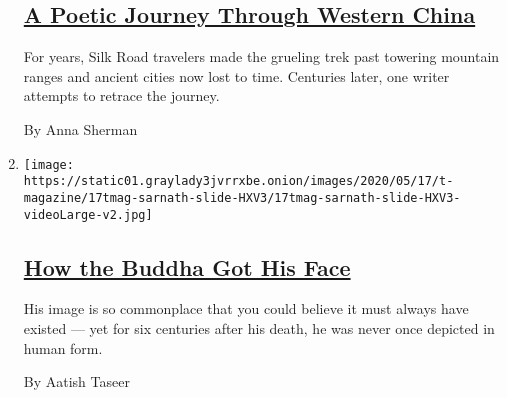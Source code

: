 \begin{enumerate}
  \hypertarget{a-poetic-journey-through-western-china}{%
  \subsection{\texorpdfstring{\href{/2020/05/11/t-magazine/china-desert.html}{A
  Poetic Journey Through Western
  China}}{A Poetic Journey Through Western China}}\label{a-poetic-journey-through-western-china}}

  For years, Silk Road travelers made the grueling trek past towering
  mountain ranges and ancient cities now lost to time. Centuries later,
  one writer attempts to retrace the journey.

  By Anna Sherman
\item
  \texttt{[image: https://static01.graylady3jvrrxbe.onion/images/2020/05/17/t-magazine/17tmag-sarnath-slide-HXV3/17tmag-sarnath-slide-HXV3-videoLarge-v2.jpg]}

  \hypertarget{how-the-buddha-got-his-face}{%
  \subsection{\texorpdfstring{\href{/2020/05/11/t-magazine/buddha-statues-face.html}{How
  the Buddha Got His
  Face}}{How the Buddha Got His Face}}\label{how-the-buddha-got-his-face}}

  His image is so commonplace that you could believe it must always have
  existed --- yet for six centuries after his death, he was never once
  depicted in human form.

  By Aatish Taseer
\end{enumerate}


